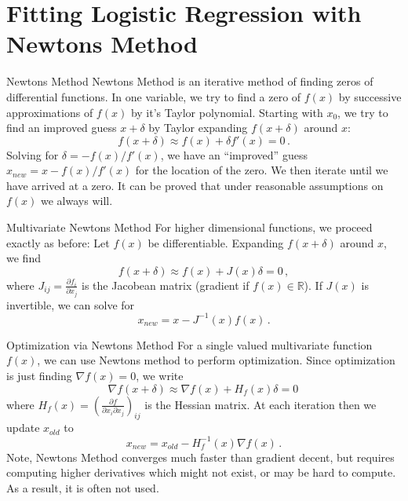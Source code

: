 \documentclass[10pt, table, dvipsnames,xcdraw, handout]{beamer}
\begin{document}
\section{Fitting Logistic Regression with Newtons Method}


\begin{frame}[fragile]{Newtons Method}
Newtons Method is an iterative method of finding zeros of differential functions. In one variable, we try to find a zero of $f(x)$ by successive approximations of $f(x)$ by it's Taylor polynomial. \pause Starting with $x_0$, we try to find an improved guess $x+\delta$ by Taylor expanding $f(x+\delta)$ around $x$:
$$
f(x+\delta) \approx f(x)+\delta f'(x) = 0\,.
$$\pause
Solving for $\delta =- f(x)/f'(x)$, we have an ``improved'' guess $x_{new} = x- f(x)/f'(x)$ for the location of the zero. \pause We then iterate until we have arrived at a zero. It can be proved that under reasonable assumptions on $f(x)$ we always will.
\end{frame}



\begin{frame}[fragile]{Multivariate Newtons Method}
For higher dimensional functions, we proceed exactly as before: Let $f(x)$ be differentiable. Expanding $f( x +  \delta)$ around $ x$, we find
$$
f( x+\delta) \approx  f(x) + J(x) \delta = 0\,,
$$
where $J_{ij} = \frac{\partial f_i}{\partial x_j}$ is the Jacobean matrix (gradient if $f(x)\in \mathbb{R}$). \pause If $J(x)$ is invertible, we can solve for
$$
x_{new} =  x - J^{-1}( x) f(x) \,.
$$
\end{frame}


\begin{frame}[fragile]{Optimization via Newtons Method}
For a single valued multivariate function $f(x)$, we can use Newtons method to perform optimization. Since optimization is just finding $\nabla f(x) = 0$, we write
$$
\nabla f(x+\delta) \approx \nabla f(x)  + H_f(x) \delta =0\,
$$
where $H_f(x) = (\frac{\partial f}{\partial x_i\partial x_j})_{ij}$ is the Hessian matrix. \pause At each iteration then we update $x_{old}$ to
$$
x_{new} = x_{old} - H^{-1}_f(x)\nabla f(x)\,.
$$\pause
Note, Newtons Method converges much faster than gradient decent, but requires computing higher derivatives which might not exist, or may be hard to compute. As a result, it is often not used. 
\end{frame}
\end{document}
